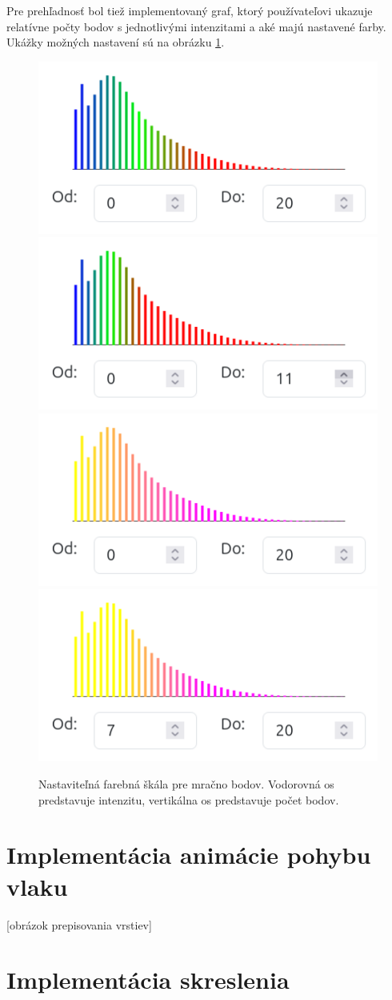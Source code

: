 Pre prehľadnosť bol tiež implementovaný graf, ktorý používateľovi ukazuje relatívne počty bodov s jednotlivými intenzitami a aké majú nastavené farby. Ukážky možných nastavení sú na obrázku \ref{fig:farebna_skala}.

\begin{figure}[h]
    \centering
    \includegraphics[width=0.35\linewidth]{text_prace/obrazky-figures/farebna_skala1.png}
    \includegraphics[width=0.35\linewidth]{text_prace/obrazky-figures/farebna_skala2.png}
    \includegraphics[width=0.35\linewidth]{text_prace/obrazky-figures/farebna_skala3.png}
    \includegraphics[width=0.35\linewidth]{text_prace/obrazky-figures/farebna_skala4.png}
    \caption{Nastaviteľná farebná škála pre mračno bodov. Vodorovná os predstavuje intenzitu, vertikálna os predstavuje počet bodov.}
    \label{fig:farebna_skala}
\end{figure}

\section{Implementácia animácie pohybu vlaku}
\label{sec:implementacia_animacie}

[obrázok prepisovania vrstiev]

\section{Implementácia skreslenia}


